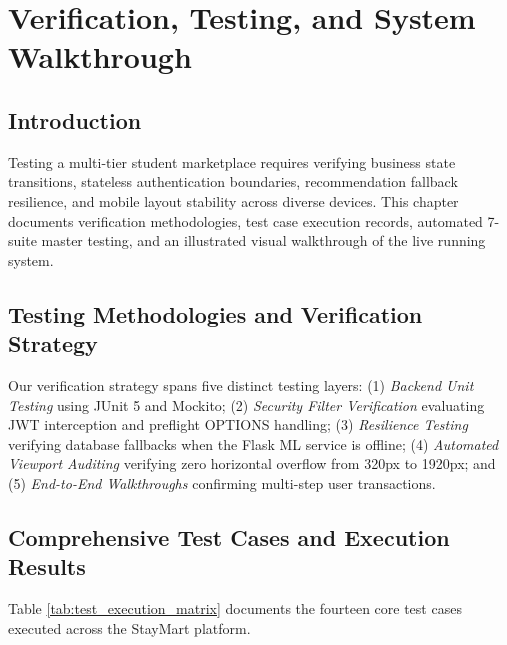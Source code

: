 \chapter{Verification, Testing, and System Walkthrough}

\section{Introduction}
Testing a multi-tier student marketplace requires verifying business state transitions, stateless authentication boundaries, recommendation fallback resilience, and mobile layout stability across diverse devices. This chapter documents verification methodologies, test case execution records, automated 7-suite master testing, and an illustrated visual walkthrough of the live running system.

\section{Testing Methodologies and Verification Strategy}
Our verification strategy spans five distinct testing layers: (1) \textit{Backend Unit Testing} using JUnit 5 and Mockito; (2) \textit{Security Filter Verification} evaluating JWT interception and preflight OPTIONS handling; (3) \textit{Resilience Testing} verifying database fallbacks when the Flask ML service is offline; (4) \textit{Automated Viewport Auditing} verifying zero horizontal overflow from 320px to 1920px; and (5) \textit{End-to-End Walkthroughs} confirming multi-step user transactions.

\section{Comprehensive Test Cases and Execution Results}
Table \ref{tab:test_execution_matrix} documents the fourteen core test cases executed across the StayMart platform.

